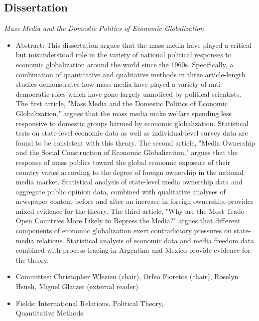 \documentclass[margin, 12pt]{res} %
\begin{document}
\begin{resume}
\section{Dissertation}
\emph{Mass Media and the Domestic Politics of Economic Globalization} \\
\begin{itemize}
\item Abstract: This dissertation argues that the mass media have played a critical but misunderstood role in the variety of national political responses to economic globalization around the world since the 1960s. Specifically, a combination of quantitative and qualitative methods in three article-length studies demonstrates how mass media have played a variety of anti-democratic roles which have gone largely unnoticed by political scientists. The first article, "Mass Media and the Domestic Politics of Economic Globalization," argues that the mass media make welfare spending less responsive to domestic groups harmed by economic globalization. Statistical tests on state-level economic data as well as individual-level survey data are found to be consistent with this theory. The second article, "Media Ownership and the Social Construction of Economic Globalization," argues that the response of mass publics toward the global economic exposure of their country varies according to the degree of foreign ownership in the national media market. Statistical analysis of state-level media ownership data and aggregate public opinion data, combined with qualitative analyses of newspaper content before and after an increase in foreign ownership, provides mixed evidence for the theory. The third article, "Why are the Most Trade-Open Countries More Likely to Repress the Media?" argues that different components of economic globalization exert contradictory pressures on state-media relations. Statistical analysis of economic data and media freedom data combined with process-tracing in Argentina and Mexico provide evidence for the theory.

\item Committee: Christopher Wlezien (chair), Orfeo Fioretos (chair),
Roselyn Hsueh, Miguel Glatzer (external reader)
\item Fields: International Relations, Political Theory, \\
Quantitative Methods \\
\end{itemize}



\end{resume}
\end{document}
